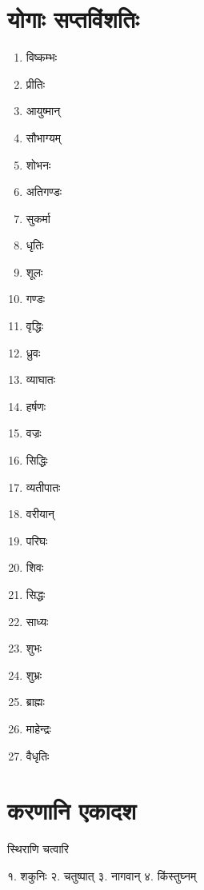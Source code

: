 \clearpage
\section*{योगाः सप्तविंशतिः}

\begin{multicols}{3}
\begin{enumerate}\itemsep-1ex 

\item विष्कम्भः 
\item प्रीतिः 
\item आयुष्मान् 
\item सौभाग्यम् 
\item शोभनः 
\item अतिगण्डः 
\item सुकर्मा 
\item धृतिः 
\item शूलः
\item गण्डः 
\item वृद्धिः 
\item ध्रुवः 
\item व्याघातः 
\item हर्षणः 
\item वज्रः 
\item सिद्धिः 
\item व्यतीपातः 
\item वरीयान्
\item परिघः 
\item शिवः 
\item सिद्धः 
\item साध्यः 
\item शुभः 
\item शुभ्रः 
\item ब्राह्मः 
\item माहेन्द्रः 
\item वैधृतिः

\end{enumerate}
\end{multicols}

\section*{करणानि एकादश} 

{स्थिराणि चत्वारि}

१. शकुनिः \hspace{2ex} २. चतुष्पात् \hspace{2ex} ३. नागवान् \hspace{2ex} ४. किंस्तुघ्नम्


